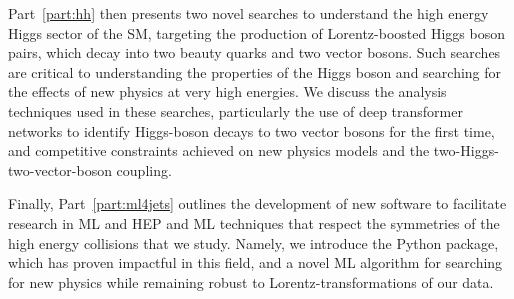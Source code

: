 Part~\ref{part:hh} then presents two novel searches to understand the high energy Higgs sector of the SM, targeting the production of Lorentz-boosted Higgs boson pairs, which decay into two beauty quarks and two vector bosons.
Such searches are critical to understanding the properties of the Higgs boson and searching for the effects of new physics at very high energies.
We discuss the analysis techniques used in these searches, particularly the use of deep transformer networks to identify Higgs-boson decays to two vector bosons for the first time, and competitive constraints achieved on new physics models and the two-Higgs-two-vector-boson coupling.

Finally, Part~\ref{part:ml4jets} outlines the development of new software to facilitate research in ML and HEP and ML techniques that respect the symmetries of the high energy collisions that we study.
Namely, we introduce the \jetnet Python package, which has proven impactful in this field, and a novel ML algorithm for searching for new physics while remaining robust to Lorentz-transformations of our data.